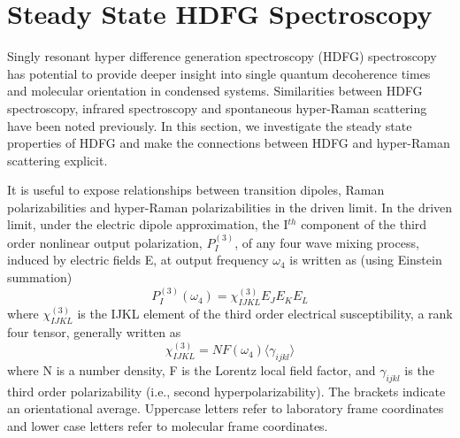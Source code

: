 \documentclass[aip, jcp, reprint, twocolumn]{revtex4-2}
\begin{document}
\section{Steady State HDFG Spectroscopy}\label{steadystate}
Singly resonant hyper difference generation spectroscopy (HDFG) spectroscopy has potential to provide deeper insight into single quantum decoherence times and molecular orientation in condensed systems.
Similarities between HDFG spectroscopy, infrared spectroscopy and spontaneous hyper-Raman scattering have been noted previously. \cite{RN352, Bonn2024}
In this section, we investigate the steady state properties of HDFG and make the connections between HDFG and hyper-Raman scattering explicit.

It is useful to expose relationships between transition dipoles, Raman polarizabilities and hyper-Raman polarizabilities in the driven limit. \cite{Druet1978, Simpson2004}
In the driven limit, under the electric dipole approximation, the I$^{th}$ component of the third order nonlinear output polarization, ${P}^{(3)}_I$, of any four wave mixing process, induced by electric fields E, at output frequency $\omega_4$ is written as (using Einstein summation) \cite{RN307}
\begin{equation} \label{polarization}
{P}^{(3)}_I (\omega_4)  = \chi^{(3)}_{IJKL} E_J E_K E_L 
\end{equation}
where $\chi^{(3)}_{IJKL}$ is the IJKL element of the third order electrical susceptibility, a rank four tensor, generally written as
\begin{equation}
	\chi^{(3)}_{IJKL} = NF(\omega_4) \langle \gamma_{ijkl} \rangle
\end{equation}
where N is a number density, F is the Lorentz local field factor, and $\gamma_{ijkl}$ is the third order polarizability (i.e., second hyperpolarizability). 
The brackets indicate an orientational average. 
Uppercase letters refer to laboratory frame coordinates and lower case letters refer to molecular frame coordinates.
\end{document}
